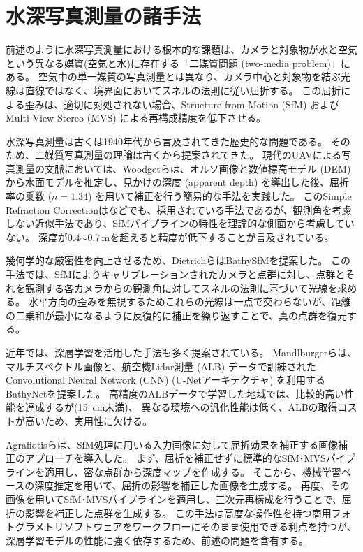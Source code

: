\section{水深写真測量の諸手法}


前述のように水深写真測量における根本的な課題は、カメラと対象物が水と空気という異なる媒質(空気と水)に存在する「二媒質問題 (two-media problem)」にある。
空気中の単一媒質の写真測量とは異なり、カメラ中心と対象物を結ぶ光線は直線ではなく、境界面においてスネルの法則に従い屈折する。
この屈折による歪みは、適切に対処されない場合、Structure-from-Motion (SfM) および Multi-View Stereo (MVS) による再構成精度を低下させる。

水深写真測量は古くは1940年代から言及されてきた歴史的な問題である\cite{Rinner1948_TwoMediumPhotogrammetry}。
そのため、二媒質写真測量の理論は古くから提案されてきた\cite{kotowski1988_RefractiveCorrectionN,Murase2008_refractiveCorrection}。
現代のUAVによる写真測量の文脈においては、Woodgetら\cite{Woodget2014_PhotograBathy-multiply-n}は、オルソ画像と数値標高モデル (DEM) から水面モデルを推定し、見かけの深度 (apparent depth) を導出した後、屈折率の乗数 ($n=1.34$) を用いて補正を行う簡易的な手法を実践した。
このSimple Refraction Correctionは\cite{westaway2001_PhotograBathy-multiply-n}などでも、採用されている手法であるが、観測角を考慮しない近似手法であり、SfMパイプラインの特性を理論的な側面から考慮していない。
深度が0.4$\sim$0.7\,mを超えると精度が低下することが言及されている。

幾何学的な厳密性を向上させるため、Dietrichら\cite{Dietrich2016_multi-angle-correction}はBathySfMを提案した。
この手法では、SfMによりキャリブレーションされたカメラと点群に対し、点群とそれを観測する各カメラからの観測角に対してスネルの法則に基づいて光線を求める。
水平方向の歪みを無視するためこれらの光線は一点で交わらないが、距離の二乗和が最小になるように反復的に補正を繰り返すことで、真の点群を復元する。

近年では、深層学習を活用した手法も多く提案されている。
Mandlburgerら\cite{Mandlburger2021_BathyNet}は、マルチスペクトル画像と、航空機Lidar測量 (ALB) データで訓練されたConvolutional Neural Network (CNN) (U-Net\cite{Ronneberger2015_U-Net}アーキテクチャ) を利用するBathyNetを提案した。
高精度のALBデータで学習した地域では、比較的高い性能を達成するが(\qty{15}{cm}未満)、
異なる環境への汎化性能は低く、ALBの取得コストが高いため、実用性に欠ける。

Agrafiotisら\cite{Agrafiotis2020_refractiveCorrection}は、SfM処理に用いる入力画像に対して屈折効果を補正する画像補正のアプローチを導入した。
まず、屈折を補正せずに標準的なSfM･MVSパイプラインを適用し、密な点群から深度マップを作成する。
そこから、機械学習ベースの深度推定を用いて、屈折の影響を補正した画像を生成する。
再度、その画像を用いてSfM･MVSパイプラインを適用し、三次元再構成を行うことで、屈折の影響を補正した点群を生成する。
この手法は高度な操作性を持つ商用フォトグラメトリソフトウェアをワークフローにそのまま使用できる利点を持つが、深層学習モデルの性能に強く依存するため、前述の問題を含有する。

